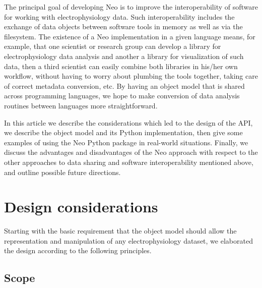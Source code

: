 \documentclass{frontiers}
\begin{document}
The principal goal of developing Neo is to improve the interoperability of software for working with electrophysiology data. Such interoperability includes the exchange of data objects between software tools in memory as well as via the filesystem. The existence of a Neo implementation in a given language means, for example, that one scientist or research group can develop a library for electrophysiology data analysis and another a library for visualization of such data, then a third scientist can easily combine both libraries in his/her own workflow, without having to worry about plumbing the tools together, taking care of correct metadata conversion, etc. By having an object model that is shared across programming languages, we hope to make conversion of data analysis routines between languages more straightforward.

In this article we describe the considerations which led to the design of the API, we describe the object model and its Python implementation, then give some examples of using the Neo Python package in real-world situations. Finally, we discuss the advantages and disadvantages of the Neo approach with respect to the other approaches to data sharing and software interoperability mentioned above, and outline possible future directions.


\section{Design considerations}


Starting with the basic requirement that the object model should allow the representation and manipulation of any electrophysiology dataset, we elaborated the design according to the following principles. 

\subsection{Scope}
\end{document}
